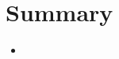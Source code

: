 \documentclass{scrartcl}
\begin{document}

\section{Summary}
\begin{itemize}
\item
\end{itemize}








%




\end{document}
